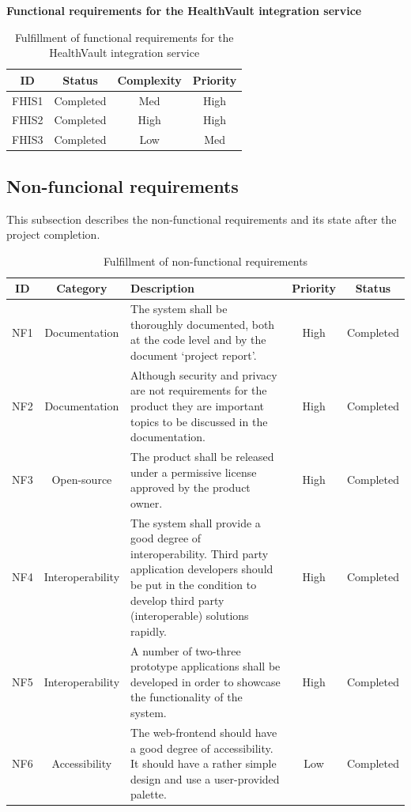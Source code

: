 \textbf{Functional requirements for the HealthVault integration service}

\begin{table}[H]
\begin{center}
\begin{tabular}{ | c | c | c | c |}
  \hline
  \textbf{ID} & \textbf{Status} & \textbf{Complexity} & \textbf{Priority}\\
  \hline\noalign{\smallskip}\hline
  FHIS1	& Completed & Med	& High \\
  FHIS2	& Completed & High	& High \\
  FHIS3	& Completed & Low	& Med \\
  \hline
\end{tabular}
\end{center}
\caption{Fulfillment of functional requirements for the HealthVault integration service}
\label{table:fulfillemntweightservice}
\end{table}

\subsection{Non-funcional requirements}
This subsection describes the non-functional requirements and its state after the project completion. 

\begin{table}[H]
\begin{center}
\begin{tabular}{ | c | c |p{6.5cm} | c | c |}
  \hline
  ID & Category & Description & Priority & Status\\
  \hline\noalign{\smallskip}\hline
  NF1 & Documentation & The system shall be thoroughly documented, both at the code level and by the document ‘project report’.
  & High & Completed \\
  NF2 & Documentation & Although security and privacy are not requirements for the product they are important topics to be discussed in the documentation.
  & High & Completed \\
  NF3 & Open-source	& The product shall be released under a permissive license approved by the product owner.
  & High & Completed \\
  NF4 & Interoperability & The system shall provide a good degree of interoperability. Third party application developers should be put in the condition to develop third party (interoperable) solutions rapidly.
  & High & Completed \\
  NF5 & Interoperability & A number of two-three prototype applications shall be developed in order to showcase the functionality of the system.
  & High & Completed \\
  NF6 & Accessibility & The web-frontend should have a good degree of accessibility. It should have a rather simple design and use a user-provided palette.
  & Low & Completed \\
  \hline
\end{tabular}
\end{center}
\caption{Fulfillment of non-functional requirements}
\label{table:fullfilmentnonfunctionalreq}
\end{table}

